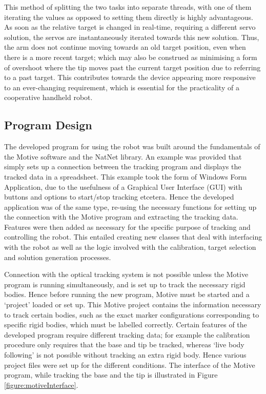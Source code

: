 \documentclass[11pt]{article}
\begin{document}
This method of splitting the two tasks into separate threads, with one of them iterating the values as opposed to setting them directly is highly advantageous. As soon as the relative target is changed in real-time, requiring a different servo solution, the servos are instantaneously iterated towards this new solution. Thus, the arm does not continue moving towards an old target position, even when there is a more recent target; which may also be construed as minimising a form of overshoot where the tip moves past the current target position due to referring to a past target. This contributes towards the device appearing more responsive to an ever-changing requirement, which is essential for the practicality of a cooperative handheld robot. 


\pagebreak
\subsection{Program Design}
\label{section:programDesign}

The developed program for using the robot was built around the fundamentals of the Motive software and the NatNet library. An example was provided that simply sets up a connection between the tracking program and displays the tracked data in a spreadsheet. This example took the form of Windows Form Application, due to the usefulness of a Graphical User Interface (GUI) with buttons and options to start/stop tracking etcetera. Hence the developed application was of the same type, re-using the necessary functions for setting up the connection with the Motive program and extracting the tracking data. Features were then added as necessary for the specific purpose of tracking and controlling the robot. This entailed creating new classes that deal with interfacing with the robot as well as the logic involved with the calibration, target selection and solution generation processes. 

Connection with the optical tracking system is not possible unless the Motive program is running simultaneously, and is set up to track the necessary rigid bodies. Hence before running the new program, Motive must be started and a `project' loaded or set up. This Motive project contains the information necessary to track certain bodies, such as the exact marker configurations corresponding to specific rigid bodies, which must be labelled correctly. Certain features of the developed program require different tracking data; for example the calibration procedure only requires that the base and tip be tracked, whereas `live body following' is not possible without tracking an extra rigid body. Hence various project files were set up for the different conditions. The interface of the Motive program, while tracking the base and the tip is illustrated in Figure \ref{figure:motiveInterface}.
\end{document}
